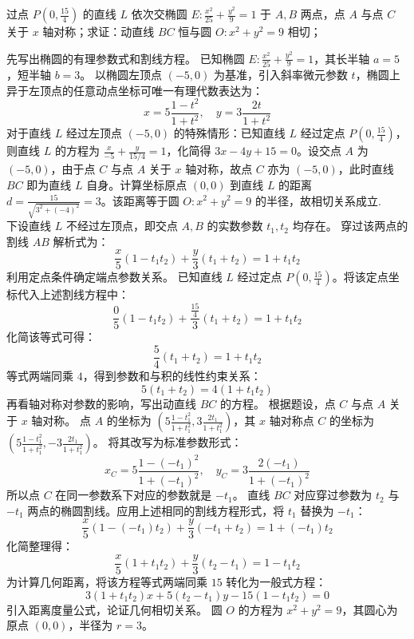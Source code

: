 \begin{example}
过点 \(P\left(0,\frac{15}{4}\right)\) 的直线 \(L\) 依次交椭圆 \(E: \frac{x^2}{25} + \frac{y^2}{9} = 1\) 于 \(A,B\) 两点，点 \(A\) 与点 \(C\) 关于 \(x\) 轴对称；\noindent 求证：动直线 \(BC\) 恒与圆 \(O: x^2 + y^2 = 9\) 相切；
\end{example}
\begin{solution}
先写出椭圆的有理参数式和割线方程。
已知椭圆 $E: \frac{x^2}{25} + \frac{y^2}{9} = 1$，其长半轴 $a=5$，短半轴 $b=3$。
以椭圆左顶点 $(-5,0)$ 为基准，引入斜率微元参数 $t$，椭圆上异于左顶点的任意动点坐标可唯一有理代数表达为：
\[ x = 5\frac{1-t^2}{1+t^2}, \quad y = 3\frac{2t}{1+t^2} \]
对于直线 $L$ 经过左顶点 $(-5,0)$ 的特殊情形：已知直线 $L$ 经过定点 $P\left(0, \frac{15}{4}\right)$，则直线 $L$ 的方程为 $\frac{x}{-5} + \frac{y}{15/4} = 1$，化简得 $3x - 4y + 15 = 0$。设交点 $A$ 为 $(-5,0)$，由于点 $C$ 与点 $A$ 关于 $x$ 轴对称，故点 $C$ 亦为 $(-5,0)$，此时直线 $BC$ 即为直线 $L$ 自身。计算坐标原点 $(0,0)$ 到直线 $L$ 的距离 $d = \frac{15}{\sqrt{3^2 + (-4)^2}} = 3$。该距离等于圆 $O: x^2 + y^2 = 9$ 的半径，故相切关系成立.\\
下设直线 $L$ 不经过左顶点，即交点 $A, B$ 的实数参数 $t_1, t_2$ 均存在。
穿过该两点的割线 $AB$ 解析式为：
\[ \frac{x}{5}(1 - t_1 t_2) + \frac{y}{3}(t_1 + t_2) = 1 + t_1 t_2 \]
利用定点条件确定端点参数关系。
已知直线 $L$ 经过定点 $P\left(0, \frac{15}{4}\right)$。将该定点坐标代入上述割线方程中：
\[ \frac{0}{5}(1 - t_1 t_2) + \frac{\frac{15}{4}}{3}(t_1 + t_2) = 1 + t_1 t_2 \]
化简该等式可得：
\[ \frac{5}{4}(t_1 + t_2) = 1 + t_1 t_2 \]
等式两端同乘 $4$，得到参数和与积的线性约束关系：
\[ 5(t_1 + t_2) = 4(1 + t_1 t_2) \]
再看轴对称对参数的影响，写出动直线 $BC$ 的方程。
根据题设，点 $C$ 与点 $A$ 关于 $x$ 轴对称。
点 $A$ 的坐标为 $\left( 5\frac{1-t_1^2}{1+t_1^2}, 3\frac{2t_1}{1+t_1^2} \right)$，其 $x$ 轴对称点 $C$ 的坐标为 $\left( 5\frac{1-t_1^2}{1+t_1^2}, -3\frac{2t_1}{1+t_1^2} \right)$。
将其改写为标准参数形式：
\[ x_C = 5\frac{1-(-t_1)^2}{1+(-t_1)^2}, \quad y_C = 3\frac{2(-t_1)}{1+(-t_1)^2} \]
所以点 $C$ 在同一参数系下对应的参数就是 $-t_1$。
直线 $BC$ 对应穿过参数为 $t_2$ 与 $-t_1$ 两点的椭圆割线。应用上述相同的割线方程形式，将 $t_1$ 替换为 $-t_1$：
\[ \frac{x}{5}(1 - (-t_1)t_2) + \frac{y}{3}(-t_1 + t_2) = 1 + (-t_1)t_2 \]
化简整理得：
\[ \frac{x}{5}(1 + t_1 t_2) + \frac{y}{3}(t_2 - t_1) = 1 - t_1 t_2 \]
为计算几何距离，将该方程等式两端同乘 $15$ 转化为一般式方程：
\[ 3(1 + t_1 t_2)x + 5(t_2 - t_1)y - 15(1 - t_1 t_2) = 0 \]
引入距离度量公式，论证几何相切关系。
圆 $O$ 的方程为 $x^2 + y^2 = 9$，其圆心为原点 $(0,0)$，半径为 $r=3$。

\end{solution}
